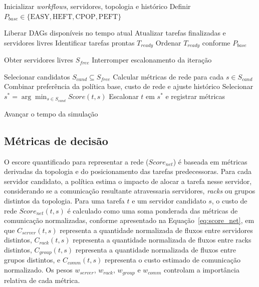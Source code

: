\documentclass[12pt]{article}
\begin{document}
\begin{algorithm}[htbp]
\caption{Simulação do escalonamento de DAGs com consciência da rede, combinado com uma política base}
\label{alg:network_aware_scheduler}
\begin{algorithmic}[1]

\STATE Inicializar \textit{workflows}, servidores, topologia e histórico
\STATE Definir $P_{base} \in \{\text{EASY}, \text{HEFT}, \text{CPOP}, \text{PEFT}\}$

    \STATE Liberar DAGs disponíveis no tempo atual
    \STATE Atualizar tarefas finalizadas e servidores livres
    \STATE Identificar tarefas prontas $T_{ready}$
    \STATE Ordenar $T_{ready}$ conforme $P_{base}$


        \STATE Obter servidores livres $S_{free}$
            \STATE Interromper escalonamento da iteração
        \ENDIF

        \STATE Selecionar candidatos $S_{cand} \subseteq S_{free}$
        \STATE Calcular métricas de rede para cada $s \in S_{cand}$
        \STATE Combinar preferência da política base, custo de rede e ajuste histórico
        \STATE Selecionar $s^* = \arg\min_{s \in S_{cand}} Score(t,s)$
        \STATE Escalonar $t$ em $s^*$ e registrar métricas

    \ENDFOR

    \STATE Avançar o tempo da simulação

\ENDWHILE

\end{algorithmic}
\end{algorithm}



\subsection{Métricas de decisão}
\label{subsec:metricas_decisao}

O escore quantificado para representar a rede ($Score_{net}$) é baseada em métricas derivadas da topologia e do posicionamento das tarefas predecessoras. 
%
Para cada servidor candidato, a política estima o impacto de alocar a tarefa nesse servidor, considerando se a comunicação resultante atravessaria servidores, \textit{racks} ou grupos distintos da topologia.
%
Para uma tarefa $t$ e um servidor candidato $s$, o custo de rede $Score_{net}(t,s)$ é calculado como uma soma ponderada das métricas de comunicação normalizadas, conforme apresentado na Equação~\ref{eq:score_net}, em que $C_{server}(t,s)$ representa a quantidade normalizada de fluxos entre servidores distintos, $C_{rack}(t,s)$ representa a quantidade normalizada de fluxos entre racks distintos, $C_{group}(t,s)$ representa a quantidade normalizada de fluxos entre grupos distintos, e $C_{comm}(t,s)$ representa o custo estimado de comunicação normalizado. Os pesos $w_{server}$, $w_{rack}$, $w_{group}$ e $w_{comm}$ controlam a importância relativa de cada métrica.
\end{document}
